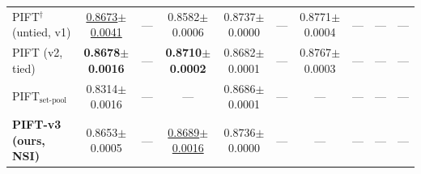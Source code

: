 \documentclass[twocolumn]{article}
\begin{document}
\begin{table}[t]
\begin{tabular}{l ccc ccc c c c}
\midrule
PIFT$^\dagger$ (untied, v1) & \underline{0.8673{\tiny$\pm$0.0041}} & — & 0.8582{\tiny$\pm$0.0006} & 0.8737{\tiny$\pm$0.0000} & — & 0.8771{\tiny$\pm$0.0004} & — & — & — \\
PIFT (v2, tied) & \textbf{0.8678{\tiny$\pm$0.0016}} & — & \textbf{0.8710{\tiny$\pm$0.0002}} & 0.8682{\tiny$\pm$0.0001} & — & 0.8767{\tiny$\pm$0.0003} & — & — & — \\
PIFT$_{\text{set-pool}}$ & 0.8314{\tiny$\pm$0.0016} & — & — & 0.8686{\tiny$\pm$0.0001} & — & — & — & — & — \\
\textbf{PIFT-v3 (ours, NSI)} & 0.8653{\tiny$\pm$0.0005} & — & \underline{0.8689{\tiny$\pm$0.0016}} & 0.8736{\tiny$\pm$0.0000} & — & — & — & — & — \\
\bottomrule
\end{tabular}
\end{table}
\end{document}
